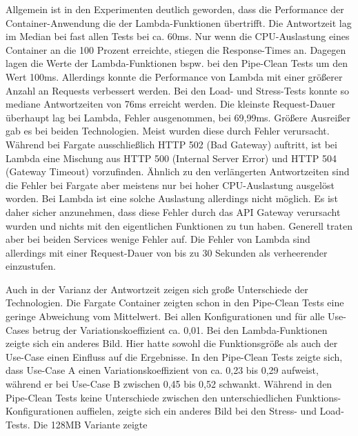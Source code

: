 Allgemein ist in den Experimenten deutlich geworden, dass die Performance der Container-Anwendung die der Lambda-Funktionen übertrifft. Die Antwortzeit lag im Median bei fast allen Tests bei ca. 60ms. Nur wenn die CPU-Auslastung eines Container an die 100 Prozent erreichte, stiegen die Response-Times an. Dagegen lagen die Werte der Lambda-Funktionen bspw. bei den Pipe-Clean Tests um den Wert 100ms. Allerdings konnte die Performance von Lambda mit einer größerer Anzahl an Requests verbessert werden. Bei den Load- und Stress-Tests konnte so mediane Antwortzeiten von 76ms erreicht werden. Die kleinste Request-Dauer überhaupt lag bei Lambda, Fehler ausgenommen, bei 69,99ms. Größere Ausreißer gab es bei beiden Technologien. Meist wurden diese durch Fehler verursacht. Während bei Fargate ausschließlich HTTP 502 (Bad Gateway) auftritt, ist bei Lambda eine Mischung aus HTTP 500 (Internal Server Error) und HTTP 504 (Gateway Timeout) vorzufinden. Ähnlich zu den verlängerten Antwortzeiten sind die Fehler bei Fargate aber meistens nur bei hoher CPU-Auslastung ausgelöst worden. Bei Lambda ist eine solche Auslastung allerdings nicht möglich. Es ist daher sicher anzunehmen, dass diese Fehler durch das API Gateway verursacht wurden und nichts mit den eigentlichen Funktionen zu tun haben. Generell traten aber bei beiden Services wenige Fehler auf. Die Fehler von Lambda sind allerdings mit einer Request-Dauer von bis zu 30 Sekunden als verheerender einzustufen.

Auch in der Varianz der Antwortzeit zeigen sich große Unterschiede der Technologien. Die Fargate Container zeigten schon in den Pipe-Clean Tests eine geringe Abweichung vom Mittelwert. Bei allen Konfigurationen und für alle Use-Cases betrug der Variationskoeffizient ca. 0,01. Bei den Lambda-Funktionen zeigte sich ein anderes Bild. Hier hatte sowohl die Funktionsgröße als auch der Use-Case einen Einfluss auf die Ergebnisse. In den Pipe-Clean Tests zeigte sich, dass Use-Case A einen Variationskoeffizient von ca. 0,23 bis 0,29 aufweist, während er bei Use-Case B zwischen 0,45 bis 0,52 schwankt. Während in den Pipe-Clean Tests keine Unterschiede zwischen den unterschiedlichen Funktions-Konfigurationen auffielen, zeigte sich ein anderes Bild bei den Stress- und Load-Tests. Die 128MB Variante zeigte 